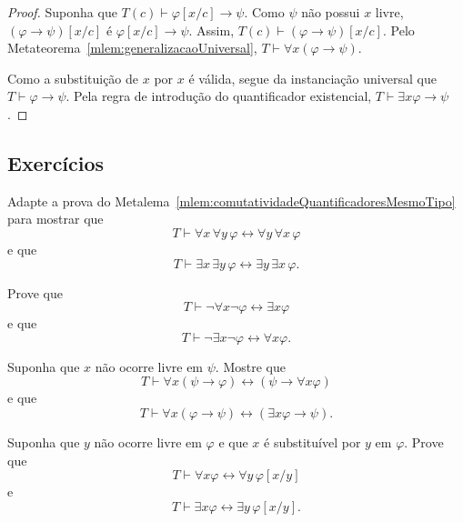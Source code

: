 \begin{proof}
    Suponha que $T(c)\vdash \varphi[x/c]\rightarrow\psi$.
    Como $\psi$ não possui $x$ livre, $(\varphi\rightarrow \psi)[x/c]$ é $\varphi[x/c]\rightarrow\psi$.
    Assim, $T(c)\vdash (\varphi\rightarrow \psi)[x/c]$.
    Pelo Metateorema~\ref{mlem:generalizacaoUniversal}, $T\vdash \forall x(\varphi\rightarrow \psi)$.
    
    Como a substituição de $x$ por $x$ é válida, segue da instanciação universal que $T\vdash \varphi\rightarrow \psi$.
    Pela regra de introdução do quantificador existencial, $T\vdash \exists x\varphi\rightarrow \psi$.
\end{proof}

\subsection*{Exercícios}

\begin{exercise}
    Adapte a prova do Metalema~\ref{mlem:comutatividadeQuantificadoresMesmoTipo} para mostrar que
    \[
        T\vdash
        \forall x\,\forall y\,\varphi
        \leftrightarrow
        \forall y\,\forall x\,\varphi
    \]
    e que
    \[
        T\vdash
        \exists x\,\exists y\,\varphi
        \leftrightarrow
        \exists y\,\exists x\,\varphi.
    \]
\end{exercise}

\begin{exercise}
    Prove que
    \[
        T\vdash \neg\forall x\neg\varphi\leftrightarrow\exists x\varphi
    \]
    e que
    \[
        T\vdash \neg\exists x\neg\varphi\leftrightarrow\forall x\varphi.
    \]
\end{exercise}

\begin{exercise}
    Suponha que $x$ não ocorre livre em $\psi$.
    Mostre que
    \[
        T\vdash
        \forall x(\psi\rightarrow\varphi)
        \leftrightarrow
        (\psi\rightarrow\forall x\varphi)
    \]
    e que
    \[
        T\vdash
        \forall x(\varphi\rightarrow\psi)
        \leftrightarrow
        (\exists x\varphi\rightarrow\psi).
    \]
\end{exercise}

\begin{exercise}
    Suponha que $y$ não ocorre livre em $\varphi$ e que $x$ é substituível por $y$ em $\varphi$.
    Prove que
    \[
        T\vdash
        \forall x\varphi
        \leftrightarrow
        \forall y\,\varphi[x/y]
    \]
    e
    \[
        T\vdash
        \exists x\varphi
        \leftrightarrow
        \exists y\,\varphi[x/y].
    \]
\end{exercise}

